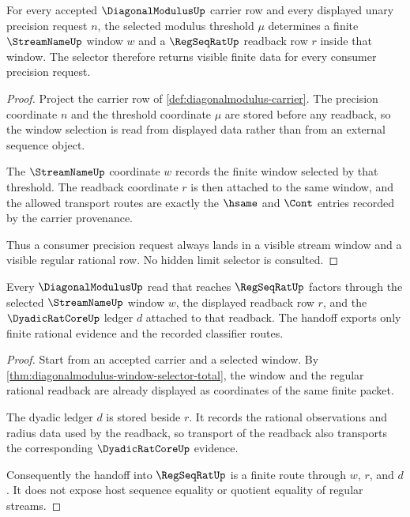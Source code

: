 \begin{theorem}
\label{thm:diagonalmodulus-window-selector-total}
For every accepted $\DiagonalModulusUp$ carrier row and every displayed unary precision request $n$, the selected modulus threshold $\mu$ determines a finite $\StreamNameUp$ window $w$ and a $\RegSeqRatUp$ readback row $r$ inside that window. The selector therefore returns visible finite data for every consumer precision request.
\end{theorem}
\begin{proof}
Project the carrier row of \autoref{def:diagonalmodulus-carrier}. The precision coordinate $n$ and the threshold coordinate $\mu$ are stored before any readback, so the window selection is read from displayed data rather than from an external sequence object.

The $\StreamNameUp$ coordinate $w$ records the finite window selected by that threshold. The readback coordinate $r$ is then attached to the same window, and the allowed transport routes are exactly the $\hsame$ and $\Cont$ entries recorded by the carrier provenance.

Thus a consumer precision request always lands in a visible stream window and a visible regular rational row. No hidden limit selector is consulted.
\end{proof}

\begin{theorem}
\label{thm:diagonalmodulus-regseqrat-handoff}
Every $\DiagonalModulusUp$ read that reaches $\RegSeqRatUp$ factors through the selected $\StreamNameUp$ window $w$, the displayed readback row $r$, and the $\DyadicRatCoreUp$ ledger $d$ attached to that readback. The handoff exports only finite rational evidence and the recorded classifier routes.
\end{theorem}
\begin{proof}
Start from an accepted carrier and a selected window. By \autoref{thm:diagonalmodulus-window-selector-total}, the window and the regular rational readback are already displayed as coordinates of the same finite packet.

The dyadic ledger $d$ is stored beside $r$. It records the rational observations and radius data used by the readback, so transport of the readback also transports the corresponding $\DyadicRatCoreUp$ evidence.

Consequently the handoff into $\RegSeqRatUp$ is a finite route through $w$, $r$, and $d$. It does not expose host sequence equality or quotient equality of regular streams.
\end{proof}

